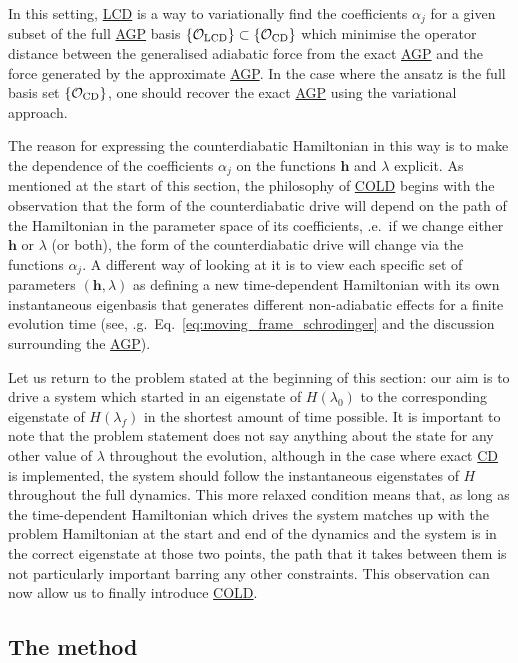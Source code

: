 \documentclass[a4paper,oneside,11pt]{book}
\newcommand{\hbb}{\boldsymbol{h}}
\newcommand{\acrref}[1]{\hyperref[acr:#1]{#1}}
\begin{document}
In this setting, \acrref{LCD} is a way to variationally find the coefficients $\alpha_j$ for a given subset of the full \acrref{AGP} basis $\{\mathcal{O}_{\rm LCD}\} \subset \{\mathcal{O}_{\rm CD}\}$ which minimise the operator distance between the generalised adiabatic force from the exact \acrref{AGP} and the force generated by the approximate \acrref{AGP}. In the case where the ansatz is the full basis set $\{\mathcal{O}_{\rm CD}\}$, one should recover the exact \acrref{AGP} using the variational approach.

The reason for expressing the counterdiabatic Hamiltonian in this way is to make the dependence of the coefficients $\alpha_j$ on the functions $\hbb$ and $\lambda$ explicit. As mentioned at the start of this section, the philosophy of \acrref{COLD} begins with the observation that the form of the counterdiabatic drive will depend on the path of the Hamiltonian in the parameter space of its coefficients, \@i.e.~if we change either $\hbb$ or $\lambda$ (or both), the form of the counterdiabatic drive will change via the functions $\alpha_j$. A different way of looking at it is to view each specific set of parameters $(\hbb, \lambda)$ as defining a new time-dependent Hamiltonian with its own instantaneous eigenbasis that generates different non-adiabatic effects for a finite evolution time (see, \@e.g.~Eq.~\eqref{eq:moving_frame_schrodinger} and the discussion surrounding the \acrref{AGP}).

Let us return to the problem stated at the beginning of this section: our aim is to drive a system which started in an eigenstate of $H(\lambda_0)$ to the corresponding eigenstate of $H(\lambda_f)$ in the shortest amount of time possible. It is important to note that the problem statement does not say anything about the state for any other value of $\lambda$ throughout the evolution, although in the case where exact \acrref{CD} is implemented, the system should follow the instantaneous eigenstates of $H$ throughout the full dynamics. This more relaxed condition means that, as long as the time-dependent Hamiltonian which drives the system matches up with the problem Hamiltonian at the start and end of the dynamics and the system is in the correct eigenstate at those two points, the path that it takes between them is not particularly important barring any other constraints. This observation can now allow us to finally introduce \acrref{COLD}.

\subsection{The method}
\end{document}
